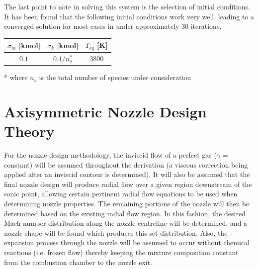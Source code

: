 	The last point to note in solving this system is the selection of initial conditions.
It has been found that the following initial conditions work very well, leading to a converged solution
for most cases in under approximately 30 iterations,

\begin{table}[h]
\begin{center}
\begin{threeparttable}


\begin{tabular}{ccc}
\toprule
$\sigma_m$ [kmol] & $\sigma_k$ [kmol]	& $T_{eq}$ [K] \\
\midrule		
$0.1$ 	&	$0.1/n_s ^*$ &	$3800$ \\
\bottomrule
\end{tabular}

\begin{tablenotes}
	\item[*] where $n_s$ is the total number of species under consideration
\end{tablenotes}

\label{table:initial}
\end{threeparttable}
\end{center}
\end{table}

\section{Axisymmetric Nozzle Design Theory}

	For the nozzle design methodology, the inviscid flow of a perfect gas ($\gamma$ = constant)
will be assumed throughout the derivation (a viscous correction being applied after an
inviscid contour is determined).  It will also be assumed that the 
final nozzle design will produce radial flow over a given region downstream of the sonic
point, allowing certain pertinent radial flow equations to be used when  
determining nozzle properties.  The remaining portions of the nozzle will then be
determined based on the existing radial flow region.  In this fashion, the desired Mach number
distribution along the nozzle centreline will be determined, and a nozzle shape will be found
which produces this set distribution.  Also, the expansion process through the nozzle will
be assumed to occur without chemical reactions (i.e. frozen flow) thereby keeping the mixture
composition constant from the combustion chamber to the nozzle exit.  

